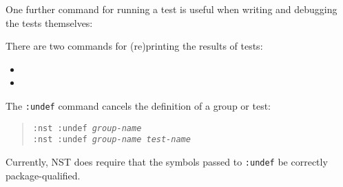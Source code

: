 \par
One further command for running a test is useful when writing and
debugging the tests themselves:


There are two commands for (re)printing the results of tests:
\begin{itemize}
\item

\item

\end{itemize}

The \texttt{:undef} command cancels the definition of a group or test:
\begin{quotation}\noindent
 \texttt{:nst :undef {\itshape group-name}}
\\ \texttt{:nst :undef {\itshape group-name} {\itshape test-name}}
\end{quotation}
Currently, NST does require that the symbols passed to \texttt{:undef}
be correctly package-qualified.

